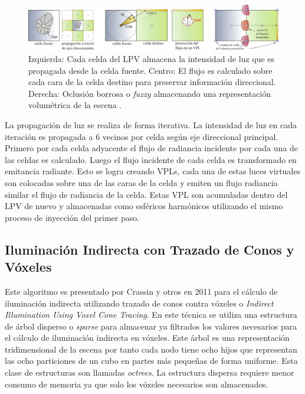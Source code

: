 \begin{figure}[H]
	\centering
	\includegraphics[width=\linewidth]{media/lpv_explain.png}
	\caption{Izquierda: Cada celda del \ac{LPV} almacena la intensidad de luz que es propagada desde la celda fuente. Centro: El flujo es calculado sobre cada cara de la celda destino para preservar información direccional. Derecha: Oclusión borrosa o \emph{fuzzy} almacenando una representación volumétrica de la escena \cite{Kaplanyan:2010}.}
	\label{fig:lpv_explain}
\end{figure}

La propagación de luz se realiza de forma iterativa. La intensidad de luz en cada iteración es propagada a 6 vecinos por celda según eje direccional principal. Primero por cada celda adyacente el flujo de radiancia incidente por cada una de las celdas es calculado. Luego el flujo incidente de cada celda es transformado en emitancia radiante. Esto se logra creando \ac{VPL}s, cada una de estas luces virtuales son colocadas sobre una de las caras de la celda y emiten un flujo radiancia similar el flujo de radiancia de la celda. Estas \ac{VPL} son acumuladas dentro del \ac{LPV} de nuevo y almacenadas como esféricos harmónicos utilizando el mismo proceso de inyección del primer paso. 

\subsection{Iluminación Indirecta con Trazado de Conos y Vóxeles}
\label{sub:voxel_cone_tracing_orig}
Este algoritmo es presentado por Crassin y otros en 2011 \cite{CNSGE11b} para el cálculo de iluminación indirecta utilizando trazado de conos contra vóxeles o \emph{Indirect Illumination Using Voxel Cone Tracing}. En este técnica se utiliza una estructura de árbol disperso o \emph{sparse} para almacenar ya filtrados los valores necesarios para el cálculo de iluminación indirecta en vóxeles. Este árbol es una representación tridimensional de la escena por tanto cada nodo tiene ocho hijos que representan las ocho particiones de un cubo en partes más pequeñas de forma uniforme. Esta clase de estructuras son llamadas \emph{octrees}. La estructura dispersa requiere menor consumo de memoria ya que solo los vóxeles necesarios son almacenados.

